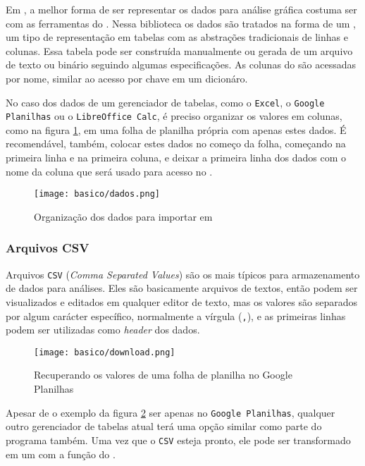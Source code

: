 Em \python, a melhor forma de ser representar os dados para análise gráfica costuma ser com as ferramentas do \pandas. Nessa biblioteca os dados são tratados na forma de um \dataframe, um tipo de representação em tabelas com as abstrações tradicionais de linhas e colunas. Essa tabela pode ser construída manualmente ou gerada de um arquivo de texto ou binário seguindo algumas especificações. As colunas do \dataframe são acessadas por nome, similar ao acesso por chave em um dicionáro.

No caso dos dados de um gerenciador de tabelas, como o \texttt{Excel}, o \texttt{Google Planilhas} ou o \texttt{LibreOffice Calc}, é preciso organizar os valores em colunas, como na figura \ref{fig:basico:dados}, em uma folha de planilha própria com apenas estes dados. É recomendável, também, colocar estes dados no começo da folha, começando na primeira linha e na primeira coluna, e deixar a primeira linha dos dados com o nome da coluna que será usado para acesso no \dataframe.

\begin{figure}[H]
    \centering
    \texttt{[image: basico/dados.png]}

    \caption{Organização dos dados para importar em \python}
    \label{fig:basico:dados}
\end{figure}


\subsubsection{Arquivos CSV}

    Arquivos \texttt{CSV} (\textit{Comma Separated Values}) são os mais típicos para armazenamento de dados para análises. Eles são basicamente arquivos de textos, então podem ser visualizados e editados em qualquer editor de texto, mas os valores são separados por algum carácter específico, normalmente a vírgula (\texttt{,}), e as primeiras linhas podem ser utilizadas como \textit{header} dos dados.

    \begin{figure}[H]
        \centering
        \texttt{[image: basico/download.png]}

        \caption{Recuperando os valores de uma folha de planilha no Google Planilhas}
        \label{fig:basico:download}
    \end{figure}

    Apesar de o exemplo da figura \ref{fig:basico:download} ser apenas no \texttt{Google Planilhas}, qualquer outro gerenciador de tabelas atual terá uma opção similar como parte do programa também. Uma vez que o \texttt{CSV} esteja pronto, ele pode ser transformado em um \dataframe com a função  do \pandas.

